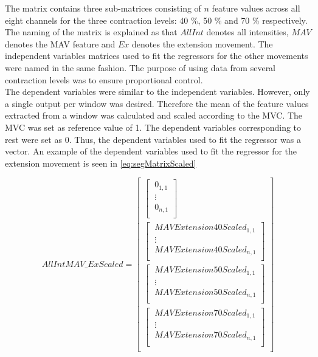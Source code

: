 The matrix contains three sub-matrices consisting of $n$ feature values across all eight channels for the three contraction levels: 40 \%, 50 \% and 70 \% respectively. The naming of the matrix is explained as that $AllInt$ denotes all intensities, $MAV$ denotes the MAV feature and $Ex$ denotes the extension movement. The independent variables matrices used to fit the regressors for the other movements were named in the same fashion. The purpose of using data from several contraction levels was to ensure proportional control. \\ 
The dependent variables were similar to the independent variables. However, only a single output per window was desired. Therefore the mean of the feature values extracted from a window was calculated and scaled according to the MVC. The MVC was set as reference value of 1. The dependent variables corresponding to rest were set as 0. Thus, the dependent variables used to fit the regressor was a vector. An example of the dependent variables used to fit the regressor for the extension movement is seen in \eqref{eq:segMatrixScaled}

\begin{equation} \label{eq:segMatrixScaled}
AllIntMAV\_ExScaled=\begin{bmatrix} 
\begin{bmatrix}
\ 0_{1,1} \\ 
\ \vdots \\
\ 0_{n,1}\\ \end{bmatrix} \\
\begin{bmatrix}
\ MAVExtension40Scaled_{1,1} \\ 
\ \vdots \\
\ MAVExtension40Scaled_{n,1}\\ \end{bmatrix} \\
\begin{bmatrix} 
\ MAVExtension50Scaled_{1,1} \\
\ \vdots \\
\ MAVExtension50Scaled_{n,1} \\ \end{bmatrix} \\
\begin{bmatrix} 
\ MAVExtension70Scaled_{1,1} \\
\ \vdots \\
\ MAVExtension70Scaled_{n,1}\\ \end{bmatrix} \\
\end{bmatrix}
\end{equation}

